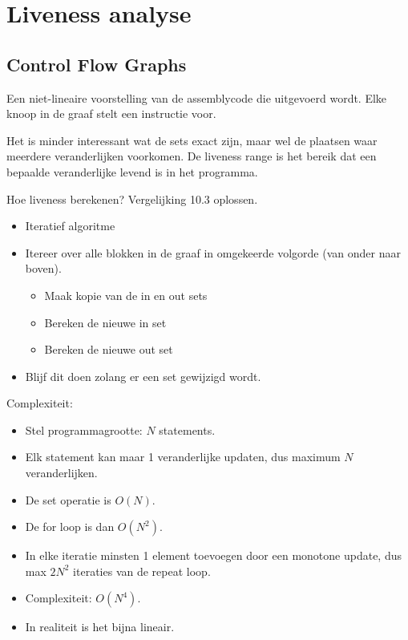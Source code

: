 \chapter{Liveness analyse}

\section{Control Flow Graphs}
Een niet-lineaire voorstelling van de assemblycode die uitgevoerd wordt. Elke knoop in de graaf stelt een instructie voor. 



Het is minder interessant wat de sets exact zijn, maar wel de plaatsen waar meerdere veranderlijken voorkomen. De liveness range is het bereik dat een bepaalde veranderlijke levend is in het programma.

Hoe liveness berekenen? Vergelijking 10.3 oplossen.
\begin{itemize}
	\item Iteratief algoritme
	\item Itereer over alle blokken in de graaf in omgekeerde volgorde (van onder naar boven).
	\begin{itemize}
		\item Maak kopie van de in en out sets
		\item Bereken de nieuwe in set
		\item Bereken de nieuwe out set
	\end{itemize}
	\item Blijf dit doen zolang er een set gewijzigd wordt.
\end{itemize}

Complexiteit:
\begin{itemize}
	\item Stel programmagrootte: $N$ statements.
	\item Elk statement kan maar 1 veranderlijke updaten, dus maximum $N$ veranderlijken.
	\item De set operatie is $O(N)$.
	\item De for loop is dan $O(N^2)$.
	\item In elke iteratie minsten 1 element toevoegen door een monotone update, dus max $2N^2$ iteraties van de repeat loop.
	\item Complexiteit: $O(N^4)$.
	\item In realiteit is het bijna lineair.
\end{itemize}

